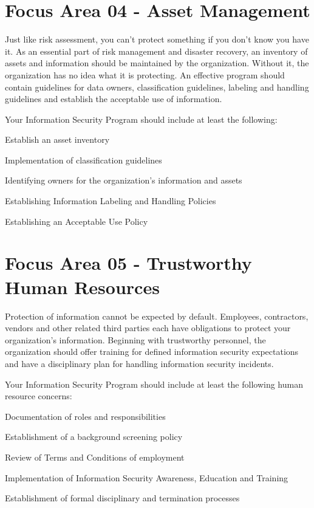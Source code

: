 \documentclass{needs}
\begin{document}
		\vspace{20pt}
		\fThreeTable
		
	\section{Focus Area 04 - Asset Management}
	
		Just like risk assessment, you can’t protect something if you don’t know you have it. As an essential part of risk management and disaster recovery, an inventory of assets and information should be maintained by the organization.  Without it, the organization has no idea what it is protecting. An effective program should contain guidelines for data owners, classification guidelines, labeling and handling guidelines and establish the acceptable use of information.
		
		Your Information Security Program should include at least the following: 
		\begin{checklist}
			\item Establish an asset inventory
			\item Implementation of classification guidelines
			\item Identifying owners for the organization’s information and assets
			\item Establishing Information Labeling and Handling Policies
			\item Establishing an Acceptable Use Policy
		\end{checklist}	
		
		\vspace{20pt}
		\fFourTable
		
	\section{Focus Area 05 - Trustworthy Human Resources}
	
		Protection of information cannot be expected by default. Employees, contractors, vendors and other related third parties each have obligations to protect your organization’s information.  Beginning with trustworthy personnel, the organization should offer training for defined information security expectations and have a disciplinary plan for handling information security incidents.
		
		Your Information Security Program should include at least the following human resource concerns: 
		\begin{checklist}
			\item Documentation of roles and responsibilities
			\item Establishment of a background screening policy
			\item Review of Terms and Conditions of employment
			\item Implementation of Information Security Awareness, Education and Training
			\item Establishment of formal disciplinary and termination processes
		\end{checklist}
		
\end{document}
